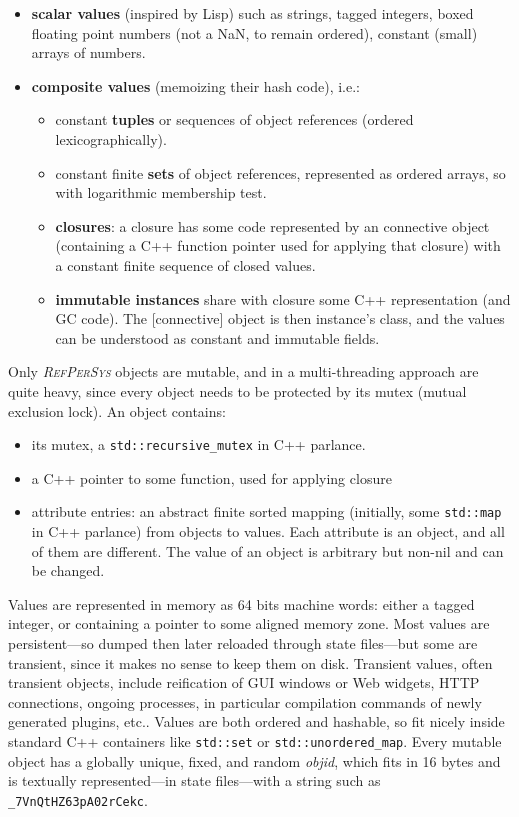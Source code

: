 \documentclass{IEEEtran}
\newcommand{\RefPerSys}{{\textit{\textsc{RefPerSys}}}}
\begin{document}
\begin{itemize}
\item \textbf{scalar values} (inspired by Lisp) such as strings,
  tagged integers, boxed floating point numbers (not a NaN, to remain
  ordered), constant (small) arrays of numbers.
\item \textbf{composite values} (memoizing their hash code), i.e.:
  \begin{itemize}
  \item constant \textbf{tuples} or sequences of object references (ordered
    lexicographically).
  \item constant finite \textbf{sets} of object references, represented as
    ordered arrays, so with logarithmic membership test.
  \item \textbf{closures}: a closure has some code represented by an
    connective object (containing a C++ function pointer used for
    applying that closure) with a constant finite sequence of closed
    values.
  \item \textbf{immutable instances} share with closure some C++
    representation (and GC code). The [connective] object is then
    instance's class, and the values can be understood as constant and
    immutable fields.
  \end{itemize}
\end{itemize}

Only {\RefPerSys} objects are mutable, and in a multi-threading
approach are quite heavy, since every object needs to be protected by
its mutex (mutual exclusion lock). An object contains:


\begin{itemize}
\item its mutex, a \texttt{std::recursive\_mutex} in C++ parlance.
\item a C++ pointer to some function, used for applying closure
  \item attribute entries: an abstract finite sorted mapping
    (initially, some \texttt{std::map} in C++ parlance) from objects
    to values. Each attribute is an object, and all of them are
    different. The value of an object is arbitrary but non-nil and can
    be changed.
\end{itemize}

\medskip


Values are represented in memory as
64 bits machine words: either a tagged integer, or containing a
pointer to some aligned memory zone. Most values are persistent---so
dumped then later reloaded through state files---but some are transient,
since it makes no sense to keep them on disk. Transient values, often
transient objects, include reification of GUI windows or Web widgets,
HTTP connections, ongoing processes, in particular compilation
commands of newly generated plugins, etc.. Values are both ordered
and hashable, so fit nicely inside standard C++ containers like
\texttt{std::set} or \texttt{std::unordered\_map}. Every mutable
object has a globally unique, fixed, and random \emph{objid}, which
fits in 16 bytes and is textually represented---in state files---with a
string such as \texttt{\_7VnQtHZ63pA02rCekc}.
\end{document}
